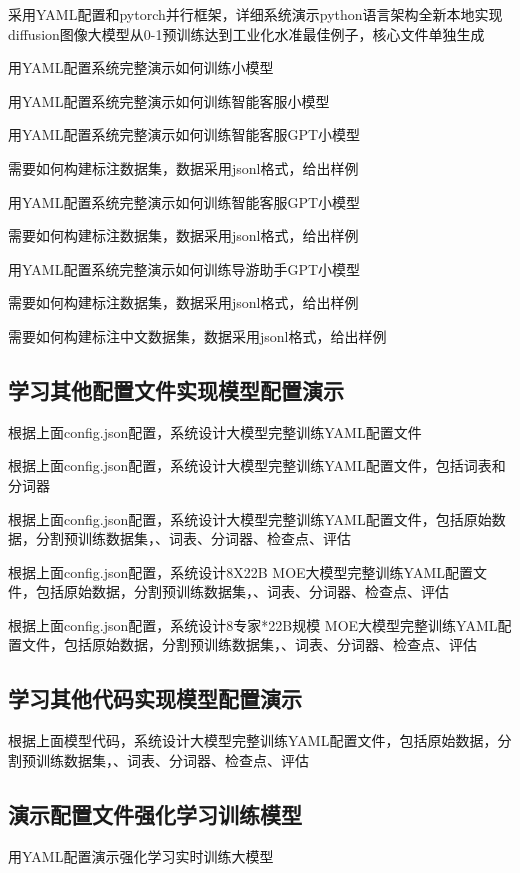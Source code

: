 \documentclass[12pt]{book}
\begin{document}
采用YAML配置和pytorch并行框架，详细系统演示python语言架构全新本地实现diffusion图像大模型从0-1预训练达到工业化水准最佳例子，核心文件单独生成



用YAML配置系统完整演示如何训练小模型


用YAML配置系统完整演示如何训练智能客服小模型


用YAML配置系统完整演示如何训练智能客服GPT小模型

需要如何构建标注数据集，数据采用jsonl格式，给出样例


用YAML配置系统完整演示如何训练智能客服GPT小模型

需要如何构建标注数据集，数据采用jsonl格式，给出样例


用YAML配置系统完整演示如何训练导游助手GPT小模型

需要如何构建标注数据集，数据采用jsonl格式，给出样例

需要如何构建标注中文数据集，数据采用jsonl格式，给出样例

\subsection{学习其他配置文件实现模型配置演示}
根据上面config.json配置，系统设计大模型完整训练YAML配置文件


根据上面config.json配置，系统设计大模型完整训练YAML配置文件，包括词表和分词器


根据上面config.json配置，系统设计大模型完整训练YAML配置文件，包括原始数据，分割预训练数据集，、词表、分词器、检查点、评估


根据上面config.json配置，系统设计8X22B MOE大模型完整训练YAML配置文件，包括原始数据，分割预训练数据集，、词表、分词器、检查点、评估


根据上面config.json配置，系统设计8专家*22B规模 MOE大模型完整训练YAML配置文件，包括原始数据，分割预训练数据集，、词表、分词器、检查点、评估


\subsection{学习其他代码实现模型配置演示}
根据上面模型代码，系统设计大模型完整训练YAML配置文件，包括原始数据，分割预训练数据集，、词表、分词器、检查点、评估



\subsection{演示配置文件强化学习训练模型}
用YAML配置演示强化学习实时训练大模型
\end{document}
